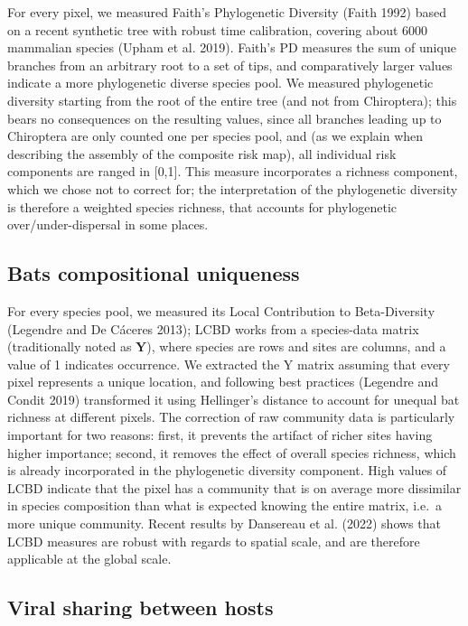 \documentclass[11pt]{article}
\begin{document}
For every pixel, we measured Faith's Phylogenetic Diversity (Faith 1992)
based on a recent synthetic tree with robust time calibration, covering
about 6000 mammalian species (Upham et al. 2019). Faith's PD measures
the sum of unique branches from an arbitrary root to a set of tips, and
comparatively larger values indicate a more phylogenetic diverse species
pool. We measured phylogenetic diversity starting from the root of the
entire tree (and not from Chiroptera); this bears no consequences on the
resulting values, since all branches leading up to Chiroptera are only
counted one per species pool, and (as we explain when describing the
assembly of the composite risk map), all individual risk components are
ranged in {[}0,1{]}. This measure incorporates a richness component,
which we chose not to correct for; the interpretation of the
phylogenetic diversity is therefore a weighted species richness, that
accounts for phylogenetic over/under-dispersal in some places.

\hypertarget{bats-compositional-uniqueness}{%
\subsection{Bats compositional
uniqueness}\label{bats-compositional-uniqueness}}

For every species pool, we measured its Local Contribution to
Beta-Diversity (Legendre and De Cáceres 2013); LCBD works from a
species-data matrix (traditionally noted as \(\mathbf{Y}\)), where
species are rows and sites are columns, and a value of 1 indicates
occurrence. We extracted the Y matrix assuming that every pixel
represents a unique location, and following best practices (Legendre and
Condit 2019) transformed it using Hellinger's distance to account for
unequal bat richness at different pixels. The correction of raw
community data is particularly important for two reasons: first, it
prevents the artifact of richer sites having higher importance; second,
it removes the effect of overall species richness, which is already
incorporated in the phylogenetic diversity component. High values of
LCBD indicate that the pixel has a community that is on average more
dissimilar in species composition than what is expected knowing the
entire matrix, i.e.~a more unique community. Recent results by Dansereau
et al. (2022) shows that LCBD measures are robust with regards to
spatial scale, and are therefore applicable at the global scale.

\hypertarget{viral-sharing-between-hosts}{%
\subsection{Viral sharing between
hosts}\label{viral-sharing-between-hosts}}
\end{document}
